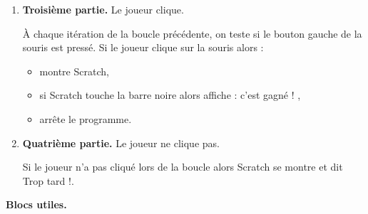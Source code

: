 \documentclass[class=report,crop=false, 12pt]{standalone}
\begin{document}
\begin{activite}
\begin{enumerate}
  \item \textbf{Troisième partie.} Le joueur clique.
  
  À chaque itération de la boucle précédente, on teste si le bouton gauche de la souris est pressé. Si le joueur clique sur la souris alors :
  \begin{itemize}
    \item montre Scratch,
    \item si Scratch touche la barre noire alors affiche : \og c'est gagné ! \fg{},
    \item arrête le programme.
  \end{itemize}  

\item \textbf{Quatrième partie.} Le joueur ne clique pas.

  Si le joueur n'a pas cliqué lors de la boucle alors Scratch se montre et dit \og{}Trop tard !\fg{}.
  
\end{enumerate}

\bigskip
\textbf{Blocs utiles.}
\begin{center}
\begin{scratch}
  { 
    \blockspace
  }
\end{scratch}
\qquad
\begin{scratch}
  { 
    \blockspace
  }
\end{scratch}
\qquad
\begin{scratch} 
  \blockspace[0.7]
  \blockspace[0.7]
\end{scratch}
\end{center}

\end{activite}
\end{document}
